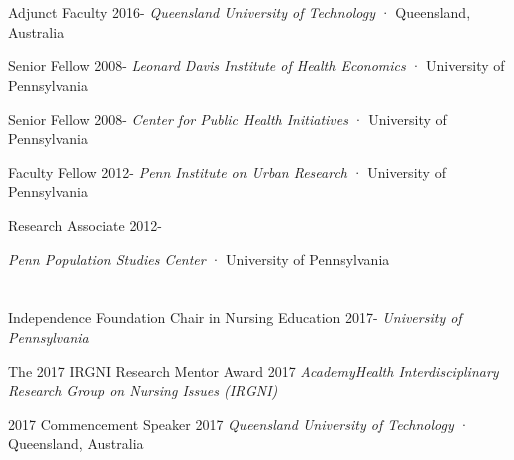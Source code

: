 \documentclass[10pt,]{article}
\begin{document}
{{{{{\section{\Large {}}

Adjunct Faculty \hfill {2016-{\small{}}} \newline
\hspace*{0.5cm} {\textit {Queensland University of Technology}} · Queensland, Australia

Senior Fellow  \hfill {2008-{\small{}}} \newline
\hspace*{0.5cm} {\textit {Leonard Davis Institute of Health Economics}} · University of Pennsylvania

Senior Fellow  \hfill {2008-{\small{}}} \newline
\hspace*{0.5cm} {\textit {Center for Public Health Initiatives}} · University of Pennsylvania

Faculty Fellow  \hfill {2012-{\small{}}} \newline
\hspace*{0.5cm} {\textit {Penn Institute on Urban Research}} · University of Pennsylvania \newline

Research Associate \hfill {2012-{\small{}}} \newline
\hspace*{0.5cm} {\textit {Penn Population Studies Center} · University of Pennsylvania

\section{\Large {}}

Independence Foundation Chair in Nursing Education \hfill {2017-{\small{}}} \newline
\hspace*{0.5cm} {\textit {University of Pennsylvania}}

The 2017 IRGNI Research Mentor Award  \hfill 2017	\newline
\hspace*{0.5cm} {\textit {AcademyHealth Interdisciplinary Research Group on Nursing Issues (IRGNI)}} 

2017 Commencement Speaker \hfill 2017	\newline
\hspace*{0.5cm} {\textit {Queensland University of Technology}} · Queensland, Australia

}}}}}}
\end{document}
